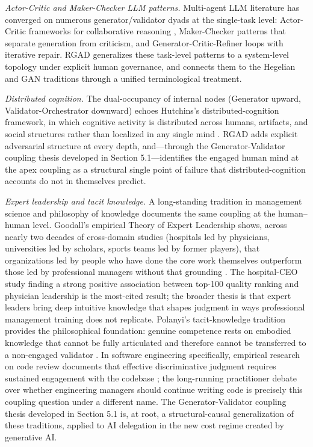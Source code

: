\documentclass[11pt,a4paper]{article}
\begin{document}
\textit{Actor-Critic and Maker-Checker LLM patterns.} Multi-agent LLM literature has converged on numerous generator/validator dyads at the single-task level: Actor-Critic frameworks for collaborative reasoning \citep{yu2024acccollab}, Maker-Checker patterns that separate generation from criticism, and Generator-Critic-Refiner loops with iterative repair. RGAD generalizes these task-level patterns to a system-level topology under explicit human governance, and connects them to the Hegelian and GAN traditions through a unified terminological treatment.

\textit{Distributed cognition.} The dual-occupancy of internal nodes (Generator upward, Validator-Orchestrator downward) echoes Hutchins's distributed-cognition framework, in which cognitive activity is distributed across humans, artifacts, and social structures rather than localized in any single mind \citep{hutchins1995}. RGAD adds explicit adversarial structure at every depth, and---through the Generator-Validator coupling thesis developed in Section 5.1---identifies the engaged human mind at the apex coupling as a structural single point of failure that distributed-cognition accounts do not in themselves predict.

\textit{Expert leadership and tacit knowledge.} A long-standing tradition in management science and philosophy of knowledge documents the same coupling at the human--human level. Goodall's empirical Theory of Expert Leadership shows, across nearly two decades of cross-domain studies (hospitals led by physicians, universities led by scholars, sports teams led by former players), that organizations led by people who have done the core work themselves outperform those led by professional managers without that grounding \citep{goodall2011}. The hospital-CEO study finding a strong positive association between top-100 quality ranking and physician leadership is the most-cited result; the broader thesis is that expert leaders bring deep intuitive knowledge that shapes judgment in ways professional management training does not replicate. Polanyi's tacit-knowledge tradition provides the philosophical foundation: genuine competence rests on embodied knowledge that cannot be fully articulated and therefore cannot be transferred to a non-engaged validator \citep{polanyi1966}. In software engineering specifically, empirical research on code review documents that effective discriminative judgment requires sustained engagement with the codebase \citep{bacchelli2013}; the long-running practitioner debate over whether engineering managers should continue writing code is precisely this coupling question under a different name. The Generator-Validator coupling thesis developed in Section 5.1 is, at root, a structural-causal generalization of these traditions, applied to AI delegation in the new cost regime created by generative AI.
\end{document}

